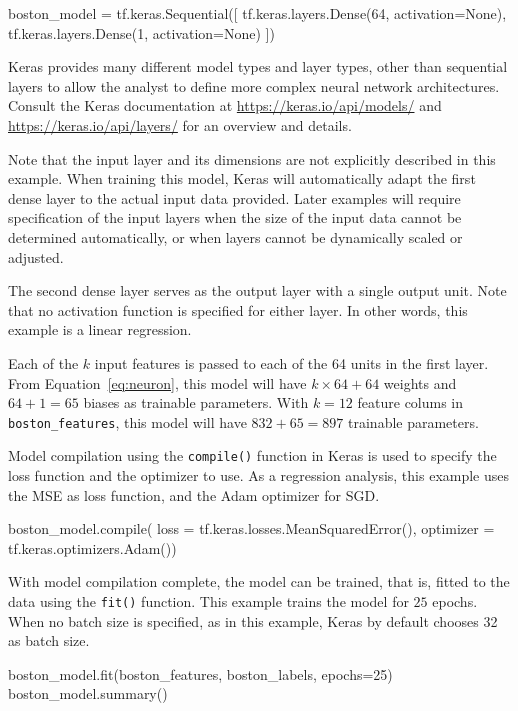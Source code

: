\begin{withcode}
\begin{pythoncode}
boston_model = tf.keras.Sequential([
  tf.keras.layers.Dense(64, activation=None),
  tf.keras.layers.Dense(1, activation=None)
])
\end{pythoncode}

Keras provides many different model types and layer types, other than sequential layers to allow the analyst to define more complex neural network architectures. Consult the Keras documentation at \url{https://keras.io/api/models/} and \url{https://keras.io/api/layers/} for an overview and details.

Note that the input layer and its dimensions are not explicitly described in this example. When training this model, Keras will automatically adapt the first dense layer to the actual input data provided. Later examples will require specification of the input layers when the size of the input data cannot be determined automatically, or when layers cannot be dynamically scaled or adjusted. 

The second dense layer serves as the output layer with a single output unit. Note that no activation function is specified for either layer. In other words, this example is a linear regression.

Each of the $k$ input features is passed to each of the 64 units in the first layer. From Equation~\ref{eq:neuron}, this model will have $k \times 64 + 64$ weights and $64 + 1 = 65$ biases as trainable parameters. With $k=12$ feature colums in \texttt{boston\_features}, this model will have $832 + 65 = 897$ trainable parameters. 

Model compilation using the \texttt{compile()} function in Keras is used to specify the loss function and the optimizer to use. As a regression analysis, this example uses the MSE as loss function, and the Adam optimizer for SGD.

\begin{pythoncode}
boston_model.compile(
    loss = tf.keras.losses.MeanSquaredError(),
    optimizer = tf.keras.optimizers.Adam())
\end{pythoncode}

With model compilation complete, the model can be trained, that is, fitted to the data using the \texttt{fit()} function. This example trains the model for $25$ epochs. When no batch size is specified, as in this example, Keras by default chooses 32 as batch size.

\begin{pythoncode}
boston_model.fit(boston_features, boston_labels, epochs=25)
boston_model.summary()
\end{pythoncode}


\end{withcode}
